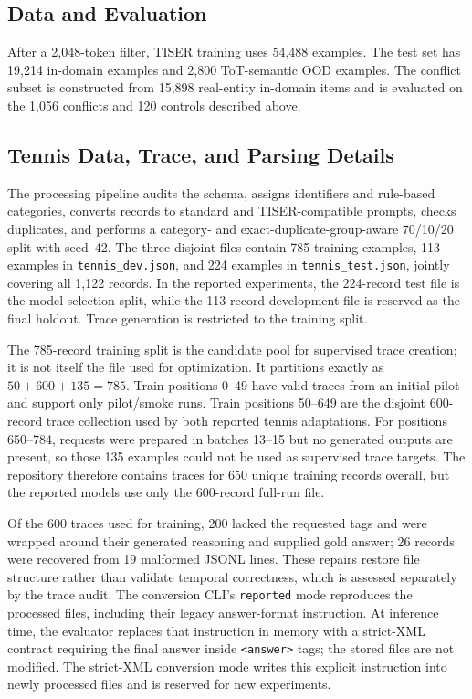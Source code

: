 \documentclass[conference]{IEEEtran}
\begin{document}
\subsection{Data and Evaluation}

After a 2,048-token filter, TISER training uses 54,488 examples. The test set has 19,214 in-domain examples and 2,800 ToT-semantic OOD examples. The conflict subset is constructed from 15,898 real-entity in-domain items and is evaluated on the 1,056 conflicts and 120 controls described above.

\subsection{Tennis Data, Trace, and Parsing Details}

The processing pipeline audits the schema, assigns identifiers and rule-based categories, converts records to standard and TISER-compatible prompts, checks duplicates, and performs a category- and exact-duplicate-group-aware 70/10/20 split with seed~42. The three disjoint files contain 785 training examples, 113 examples in \texttt{tennis\_dev.json}, and 224 examples in \texttt{tennis\_test.json}, jointly covering all 1,122 records. In the reported experiments, the 224-record test file is the model-selection split, while the 113-record development file is reserved as the final holdout. Trace generation is restricted to the training split.

The 785-record training split is the candidate pool for supervised trace creation; it is not itself the file used for optimization. It partitions exactly as $50+600+135=785$. Train positions 0--49 have valid traces from an initial pilot and support only pilot/smoke runs. Train positions 50--649 are the disjoint 600-record trace collection used by both reported tennis adaptations. For positions 650--784, requests were prepared in batches 13--15 but no generated outputs are present, so those 135 examples could not be used as supervised trace targets. The repository therefore contains traces for 650 unique training records overall, but the reported models use only the 600-record full-run file.

Of the 600 traces used for training, 200 lacked the requested tags and were wrapped around their generated reasoning and supplied gold answer; 26 records were recovered from 19 malformed JSONL lines. These repairs restore file structure rather than validate temporal correctness, which is assessed separately by the trace audit. The conversion CLI's \texttt{reported} mode reproduces the processed files, including their legacy answer-format instruction. At inference time, the evaluator replaces that instruction in memory with a strict-XML contract requiring the final answer inside \texttt{<answer>} tags; the stored files are not modified. The strict-XML conversion mode writes this explicit instruction into newly processed files and is reserved for new experiments.
\end{document}
